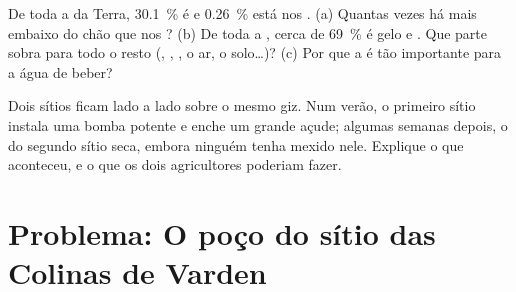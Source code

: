 \begin{exercise}[$\star\star\star$]\label{exo:g6:water-underground:11}
De toda a  da Terra, 30.1~\% é  e 0.26~\% está
nos . (a) Quantas vezes há mais  embaixo do chão que nos
? (b) De toda a , cerca de 69~\% é gelo e . Que parte
sobra para todo o resto (, , , o ar, o
solo\ldots)? (c) Por que a  é tão importante para a água
de beber?
\end{exercise}

\begin{exercise}[$\star\star\star$]\label{exo:g6:water-underground:12}
Dois sítios ficam lado a lado sobre o mesmo giz. Num verão, o primeiro
sítio instala uma bomba potente e enche um grande açude; algumas semanas
depois, o  do segundo sítio seca, embora ninguém tenha mexido nele.
Explique o que aconteceu, e o que os dois agricultores poderiam fazer.
\end{exercise}

\section{Problema: O poço do sítio das Colinas de Varden}

